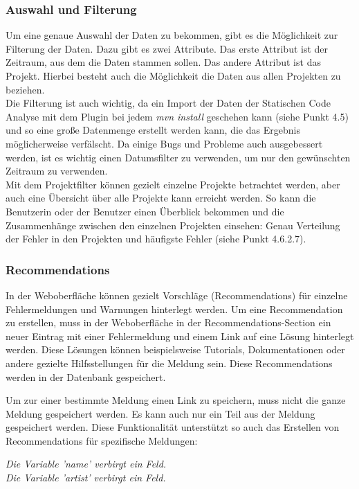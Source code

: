 \subsubsection{Auswahl und Filterung}
Um eine genaue Auswahl der Daten zu bekommen, gibt es die Möglichkeit zur Filterung der Daten. Dazu gibt es zwei Attribute. Das erste Attribut ist der Zeitraum, aus dem die Daten stammen sollen. Das andere Attribut ist das Projekt. Hierbei besteht auch die Möglichkeit die Daten aus allen Projekten zu beziehen. \\
Die Filterung ist auch wichtig, da ein Import der Daten der Statischen Code Analyse mit dem Plugin bei jedem \textit{mvn install} geschehen kann (siehe Punkt 4.5) und so eine große Datenmenge erstellt werden kann, die das Ergebnis möglicherweise verfälscht. Da einige Bugs und Probleme auch ausgebessert werden, ist es wichtig einen Datumsfilter zu verwenden, um nur den gewünschten Zeitraum zu verwenden. \\ Mit dem Projektfilter können gezielt einzelne Projekte betrachtet werden, aber auch eine Übersicht über alle Projekte kann erreicht werden. So kann die Benutzerin  oder der Benutzer einen Überblick bekommen und die Zusammenhänge zwischen den einzelnen Projekten einsehen: Genau Verteilung der Fehler in den Projekten und häufigste Fehler (siehe Punkt 4.6.2.7).

\subsubsection{Recommendations}
In der Weboberfläche können gezielt Vorschläge (Recommendations) für einzelne Fehlermeldungen und Warnungen hinterlegt werden. Um eine Recommendation zu erstellen, muss in der Weboberfläche in der Recommendations-Section ein neuer Eintrag mit einer Fehlermeldung und einem Link auf eine Lösung hinterlegt werden. Diese Lösungen können beispielsweise Tutorials, Dokumentationen oder andere gezielte Hilfsstellungen für die Meldung sein. Diese Recommendations werden in der Datenbank gespeichert.

Um zur einer bestimmte Meldung einen Link zu speichern, muss nicht die ganze Meldung gespeichert werden. Es kann auch nur ein Teil aus der Meldung gespeichert werden. Diese Funktionalität unterstützt so auch das Erstellen von Recommendations für spezifische Meldungen:

\textit{Die Variable 'name' verbirgt ein Feld.}\\
\textit{Die Variable 'artist' verbirgt ein Feld.}

